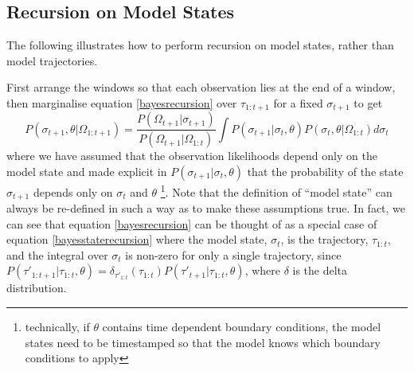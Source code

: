 \documentclass{article}
\begin{document}
%
%

\begin{appendices}

\section{Recursion on Model States}\label{appendix:state_recursion}

The following illustrates how to perform recursion on model states, rather than model trajectories.

First arrange the windows so that each observation lies at the end of a window, then marginalise equation \eqref{bayesrecursion} over $\tau_{1:t+1}$ for a fixed $\sigma_{t+1}$ to get
\begin{equation}
P\left(\sigma_{t+1}, \theta | \Omega_{1:t+1}\right)
=
\frac{ P(\Omega_{t+1}|\sigma_{t+1}) 
}
{	P(\Omega_{t+1}| \Omega_{1:t}) }
\int P(\sigma_{t+1}|\sigma_t,\theta)P\left(\sigma_{t},\theta| \Omega_{1:t}\right) d \sigma_t
\label{bayesstaterecursion}
\end{equation}
where we have assumed that the observation likelihoods depend only on the model state and made explicit in $P(\sigma_{t+1}|\sigma_t,\theta)$ that the probability of the state $\sigma_{t+1}$ depends only on $\sigma_t$ and $\theta$  \footnote{technically, if $\theta$ contains time dependent boundary conditions, the model states need to be timestamped so that the model knows which boundary conditions to apply}.   Note that the definition of ``model state'' can always be re-defined in such a way as to make these assumptions true. In fact, we can see that equation \eqref{bayesrecursion} can be thought of as a special case of equation \eqref{bayesstaterecursion} where the model state, $\sigma_t$, is the trajectory, $\tau_{1:t}$, and the integral over $\sigma_t$ is non-zero for only a single trajectory, since $P(\tau'_{1:t+1}|\tau_{1:t},\theta) = \delta_{\tau'_{1:t}}(\tau_{1:t})P(\tau'_{t+1}|\tau_{1:t},\theta)$, where $\delta$ is the delta distribution.


\end{appendices}
\end{document}
